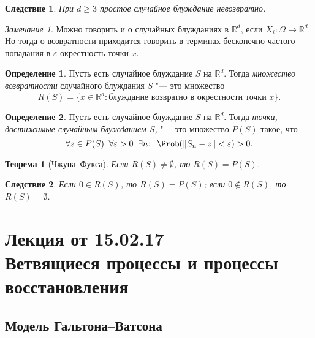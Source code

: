 \documentclass[a4paper]{article}
\theoremstyle{plain}
\newtheorem{thm}{Теорема}[section]
\newtheorem*{cor}{Следствие}
\theoremstyle{definition}
\newtheorem{defn}{Определение}[section]
\theoremstyle{remark}
\newtheorem*{rem}{Замечание}
\begin{document}
\begin{cor}
  При $d \geqslant 3$ простое случайное блуждание невозвратно.
\end{cor}

\begin{rem}
  Можно говорить и о случайных блужданиях в $\mathbb{R}^d$, если $X_{i}: \Omega \rightarrow \mathbb{R}^d$. Но тогда о возвратности приходится говорить в терминах бесконечно частого попадания в $\varepsilon$-окрестность точки $x$.
\end{rem}

\begin{defn}
  Пусть есть случайное блуждание $S$ на $\mathbb{R}^d$. Тогда \emph{множество возвратности} случайного блуждания $S$ "--- это множество
  \begin{equation*}
    R(S) = \lbrace x \in \mathbb{R}^d : \text{блуждание возвратно в окрестности точки } x \rbrace \text{.}
  \end{equation*}
\end{defn}

\begin{defn}
  Пусть есть случайное блуждание $S$ на $\mathbb{R}^d$. Тогда \emph{точки, достижимые случайным блужданием $S$,} "--- это множество $P(S)$ такое, что
  \begin{equation*}
    \forall z \in P(S) \; \; \forall \varepsilon > 0 \; \; \exists n \negmedspace : \; \, \Prob( \| S_{n} - z \| < \varepsilon) > 0 \text{.}
  \end{equation*}
\end{defn}

\begin{thm}[Чжуна--Фукса]
  Если $R(S) \neq \emptyset$, то $R(S) = P(S)$.
\end{thm}

\begin{cor}
  Если $0 \in R(S)$, то $R(S) = P(S)$; если
  $0 \notin R(S)$, то  $R(S) = \emptyset$.
\end{cor}

\section[Лекция от 15.02.17. Ветвящиеся процессы и процессы восстановления]{Лекция от 15.02.17\\ {\large Ветвящиеся процессы и процессы восстановления}}

\subsection{Модель Гальтона--Ватсона}
\end{document}

